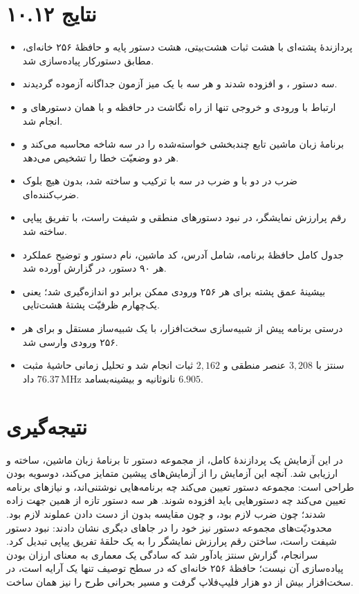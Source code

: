 \documentclass[12pt,a4paper]{article}
\begin{document}
	\section*{۱۰.۱۲ نتایج}
	\begin{itemize}
		\item پردازندهٔ پشته‌ای با هشت ثبات هشت‌بیتی، هشت دستور پایه و حافظهٔ ۲۵۶ خانه‌ای، مطابق دستورکار پیاده‌سازی شد.
		\item سه دستور ،  و  افزوده شدند و هر سه با یک میز آزمون جداگانه آزموده گردیدند.
		\item ارتباط با ورودی و خروجی تنها از راه نگاشت در حافظه و با همان دستورهای  و  انجام شد.
		\item برنامهٔ زبان ماشین تابع چندبخشی خواسته‌شده را در سه شاخه محاسبه می‌کند و هر دو وضعیّت خطا را تشخیص می‌دهد.
		\item ضرب در دو با  و ضرب در سه با ترکیب  و  ساخته شد، بدون هیچ بلوک ضرب‌کننده‌ای.
		\item رقم پرارزش نمایشگر، در نبود دستورهای منطقی و شیفت راست، با تفریق پیاپی ساخته شد.
		\item جدول کامل حافظهٔ برنامه، شامل آدرس، کد ماشین، نام دستور و توضیح عملکرد هر ۹۰ دستور، در گزارش آورده شد.
		\item بیشینهٔ عمق پشته برای هر ۲۵۶ ورودی ممکن برابر دو اندازه‌گیری شد؛ یعنی یک‌چهارم ظرفیّت پشتهٔ هشت‌تایی.
		\item درستی برنامه پیش از شبیه‌سازی سخت‌افزار، با یک شبیه‌ساز مستقل و برای هر ۲۵۶ ورودی وارسی شد.
		\item سنتز با \(3{,}208\) عنصر منطقی و \(2{,}162\) ثبات انجام شد و تحلیل زمانی حاشیهٔ مثبت \(6.905\) نانوثانیه و بیشینه‌بسامد \(76.37\,\mathrm{MHz}\) داد.
	\end{itemize}

	\section*{نتیجه‌گیری}
	در این آزمایش یک پردازندهٔ کامل، از مجموعه دستور تا برنامهٔ زبان ماشین، ساخته و ارزیابی شد. آنچه این آزمایش را از آزمایش‌های پیشین متمایز می‌کند، دوسویه بودن طراحی است: مجموعه دستور تعیین می‌کند چه برنامه‌هایی نوشتنی‌اند، و نیازهای برنامه تعیین می‌کند چه دستورهایی باید افزوده شوند. هر سه دستور تازه از همین جهت زاده شدند؛  چون ضرب لازم بود، و  چون مقایسه بدون از دست دادن عملوند لازم بود. محدودیّت‌های مجموعه دستور نیز خود را در جاهای دیگری نشان دادند: نبود دستور شیفت راست، ساختن رقم پرارزش نمایشگر را به یک حلقهٔ تفریق پیاپی تبدیل کرد. سرانجام، گزارش سنتز یادآور شد که سادگی یک معماری به معنای ارزان بودن پیاده‌سازی آن نیست؛ حافظهٔ ۲۵۶ خانه‌ای که در سطح توصیف تنها یک آرایه است، در سخت‌افزار بیش از دو هزار فلیپ‌فلاپ گرفت و مسیر بحرانی طرح را نیز همان ساخت.
\end{document}
